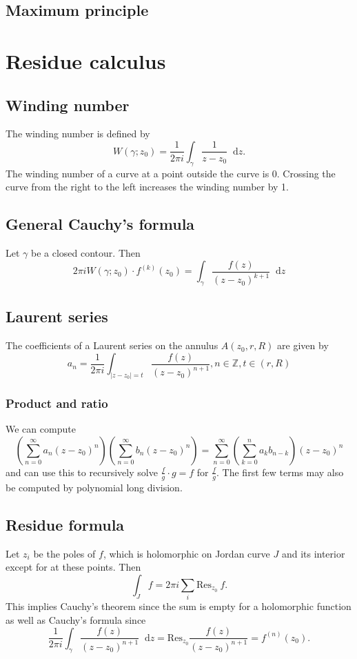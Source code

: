\documentclass{article}
\newcommand\dif{\mathop{}\!\mathrm{d}}
\newcommand{\Res}{\mathrm{Res}}
\begin{document}
\subsection{Maximum principle}



\section{Residue calculus}

\subsection{Winding number}
The winding number is defined by
$$
  W(\gamma; z_0)
= \frac{1}{2 \pi i}
  \int_\gamma
    \frac{1}{z - z_0}
    \dif z.
$$
The winding number of a curve at a point outside the curve is
0. Crossing the curve from the right to the left increases the winding
number by 1.

\subsection{General Cauchy's formula}
Let $\gamma$ be a closed contour. Then
$$
  2 \pi i W(\gamma; z_0) \cdot f^{(k)}(z_0)
= \int_\gamma
    \frac{f(z)}{(z - z_0)^{k+1}}
    \dif z
$$

\subsection{Laurent series}

The coefficients of a Laurent series on the annulus $A(z_0, r, R)$
are given by
$$
  a_n
= \frac{1}{2 \pi i}
  \int_{|z - z_0| = t}
    \frac{f(z)}{(z - z_0)^{n+1}},
n \in \mathbb{Z},
t \in (r, R)
$$

\subsubsection{Product and ratio}
We can compute
$$
  \left(
    \sum_{n=0}^\infty
      a_n
      (z - z_0)^n
  \right)
  \left(
    \sum_{n=0}^\infty
      b_n
      (z - z_0)^n
  \right)
= \sum_{n=0}^\infty
    \left(
      \sum_{k=0}^n
        a_k
        b_{n-k}
    \right)
    (z - z_0)^n
$$
and can use this to recursively solve $\frac{f}{g} \cdot g = f$ for
$\frac{f}{g}$. The first few terms may also be computed by polynomial
long division.

\subsection{Residue formula}
Let $z_i$ be the poles of $f$, which is holomorphic on
Jordan curve $J$ and its interior except for
at these points. Then
$$
  \int_J f
= 2 \pi i
  \sum_i
  \Res_{z_0}~f.
$$
This implies Cauchy's theorem since the sum is empty for a holomorphic
function as well as Cauchy's formula since
$$
  \frac{1}{2 \pi i}
  \int_\gamma
    \frac{f(z)}
         {(z - z_0)^{n+1}}
    \dif z
= \Res_{z_0}
    \frac{f(z)}{(z - z_0)^{n+1}}
= f^{(n)}(z_0).
$$
\end{document}
